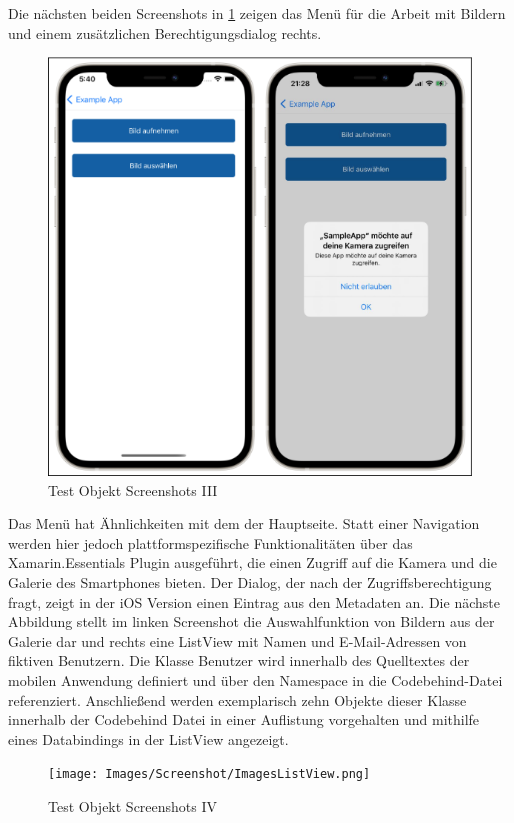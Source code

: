 Die nächsten beiden Screenshots in \ref{fig:TestObjectIII} zeigen das Menü für die Arbeit mit Bildern und einem zusätzlichen Berechtigungsdialog rechts.

 
\begin{figure}[!ht]
 \includegraphics[width=\textwidth,keepaspectratio]{Images/Screenshot/Permissions.png}
 \caption{Test Objekt Screenshots III}
 \label{fig:TestObjectIII}
\end{figure}
Das Menü hat Ähnlichkeiten mit dem der Hauptseite.  Statt einer Navigation werden hier jedoch plattformspezifische Funktionalitäten über das Xamarin.Essentials Plugin ausgeführt, die einen Zugriff auf die Kamera und die Galerie des Smartphones bieten.  Der Dialog,  der nach der Zugriffsberechtigung fragt, zeigt in der iOS Version einen Eintrag aus den Metadaten an.
Die nächste Abbildung stellt im linken Screenshot die Auswahlfunktion von Bildern aus der Galerie dar und rechts eine ListView mit Namen und E-Mail-Adressen von fiktiven Benutzern.  
Die Klasse \glq Benutzer\grq{} wird innerhalb des Quelltextes der mobilen Anwendung definiert und über den Namespace in die Codebehind-Datei referenziert.  Anschließend werden exemplarisch zehn Objekte dieser Klasse innerhalb der Codebehind Datei in einer Auflistung vorgehalten und mithilfe eines Databindings in der ListView angezeigt. 
 
\begin{figure}[!ht]
 \texttt{[image: Images/Screenshot/ImagesListView.png]}
 \caption{Test Objekt Screenshots IV}
 \label{fig:TestObjectIV}
\end{figure}


